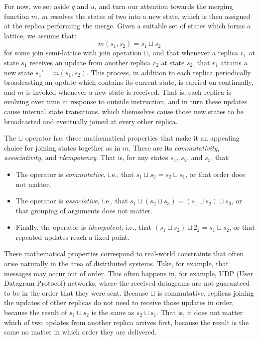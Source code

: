For now, we set aside $q$ and $u$, and turn our attention towards the merging
function $m$. $m$ resolves the states of two \CRDTs into a new state, which is
then assigned at the replica performing the merge. Given a suitable set of
states which forms a lattice, we assume that:
\[
  m(s_1, s_2) = s_1 \sqcup s_2
\]
for some join semi-lattice with join operation $\sqcup$, and that whenever a
\CRDT replica $r_1$ at state $s_1$ receives an update from another replica
$r_2$ at state $s_2$, that $r_1$ attains a new state $s_1' = m(s_1, s_2)$.
This process, in addition to each replica periodically broadcasting an update
which contains its current state, is carried on continually, and $m$ is
invoked whenever a new state is received. That is, each replica is evolving
over time in response to outside instruction, and in turn these updates cause
internal state transitions, which themselves cause those new states to be
broadcasted and eventually joined at every other replica.

The $\sqcup$ operator has three mathematical properties that make it an
appealing choice for joining states together as in $m$. These are its
\emph{commutativity}, \emph{associativity}, and \emph{idempotency}. That is, for
any states $s_1$, $s_2$, and $s_3$, that:
\begin{itemize}
  \item The operator is \emph{commutative}, i.e., that $s_1 \sqcup s_2 = s_2
    \sqcup s_1$, or that order does not matter.
  \item The operator is \emph{associative}, i.e., that $s_1 \sqcup (s_2 \sqcup
    s_3) = (s_1 \sqcup s_2) \sqcup s_3$, or that grouping of arguments does not
    matter.
  \item Finally, the operator is \emph{idempotent}, i.e., that $(s_1 \sqcup s_2)
    \sqcup 2_2 = s_1 \sqcup s_2$, or that repeated updates reach a fixed point.
\end{itemize}

These mathematical properties correspond to real-world constraints that often
arise naturally in the area of distributed systems. Take, for example, that
messages may occur out of order. This often happens in, for example, UDP (User
Datagram Protocol) networks, where the received datagrams are not guaranteed to
be in the order that they were sent. Because $\sqcup$ is commutative, replicas
joining the updates of other replicas do not need to receive those updates in
order, because the result of $s_1 \sqcup s_2$ is the same as $s_2 \sqcup s_1$.
That is, it does not matter which of two updates from another replica arrives
first, because the result is the same no matter in which order they are
delivered.

